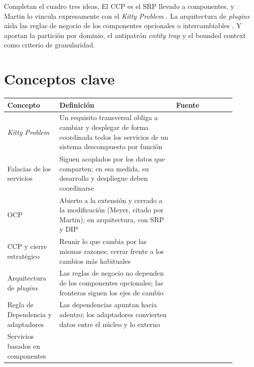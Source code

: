 Completan el cuadro tres ideas. El CCP es el SRP llevado a componentes, y Martin lo
vincula expresamente con el \emph{Kitty Problem} \parencite[105--106]{martin2017}. La
arquitectura de \emph{plugins} aísla las reglas de negocio de los componentes opcionales
o intercambiables \parencite[170--173]{martin2017}. Y
\textcite[caps.~8 y 17]{richardsford2020} aportan la partición por dominio, el antipatrón
\emph{entity trap} y el bounded context como criterio de granularidad.

\section{Conceptos clave}

\begin{table}[htbp]
  \centering
  \footnotesize
  \renewcommand{\arraystretch}{1.2}
  \begin{tabular}{@{}p{0.21\linewidth}p{0.47\linewidth}p{0.24\linewidth}@{}}
    \toprule
    \textbf{Concepto} & \textbf{Definición} & \textbf{Fuente} \\
    \midrule
    \raggedright \emph{Kitty Problem}
      & \raggedright Un requisito transversal obliga a cambiar y desplegar de forma
        coordinada todos los servicios de un sistema descompuesto por función
      & \raggedright \textcite[242--243]{martin2017} \tabularnewline
    \raggedright Falacias de los servicios
      & \raggedright Siguen acoplados por los datos que comparten; en esa medida, su
        desarrollo y despliegue deben coordinarse
      & \raggedright \textcite[240--241]{martin2017} \tabularnewline
    \raggedright OCP
      & \raggedright Abierto a la extensión y cerrado a la modificación (Meyer, citado por
        Martin); en arquitectura, con SRP y DIP
      & \raggedright \textcite[70, 73--74]{martin2017} \tabularnewline
    \raggedright CCP y cierre estratégico
      & \raggedright Reunir lo que cambia por las mismas razones; cerrar frente a los
        cambios más habituales
      & \raggedright \textcite[105--106]{martin2017} \tabularnewline
    \raggedright Arquitectura de \emph{plugins}
      & \raggedright Las reglas de negocio no dependen de los componentes opcionales; las
        fronteras siguen los ejes de cambio
      & \raggedright \textcite[170--173]{martin2017} \tabularnewline
    \raggedright Regla de Dependencia y adaptadores
      & \raggedright Las dependencias apuntan hacia adentro; los adaptadores convierten
        datos entre el núcleo y lo externo
      & \raggedright \textcite[203, 205]{martin2017} \tabularnewline
    \raggedright Servicios basados en componentes

\end{tabular}
\end{table}
